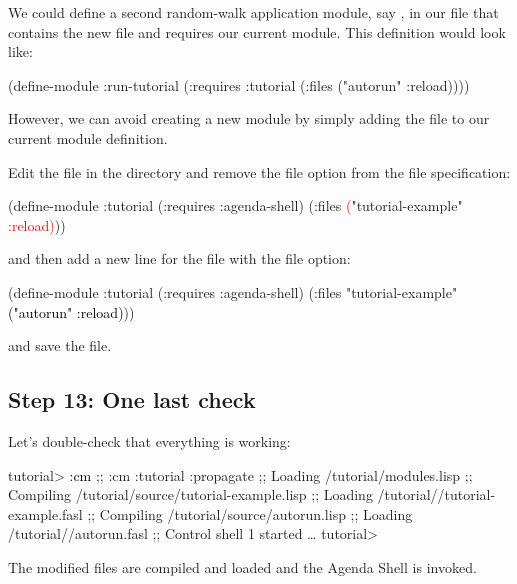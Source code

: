 \documentclass[10pt,twoside,english,pdftex]{article}
\begin{document}
We could define a second random-walk application module, say
, in our  file that
contains the new  file and requires our current
 module.  This definition would look like:
%
\W\supp
\begin{example}
\textcolor{darkergray}{%
  (define-module :run-tutorial
    (:requires :tutorial
    (:files ("autorun" :reload))))}
\end{example}
%
However, we can avoid creating a new module by simply adding the
 file to our current  module definition.  

Edit the  file in the  directory and
remove the  file option from the 
file specification:
%
\W\supp
\begin{example}
\textcolor{darkergray}{%
  (define-module :tutorial
    (:requires :agenda-shell)
    (:files \textcolor{red}{(}"tutorial-example" \textcolor{red}{:reload)}))}
\end{example}
%
and then add a new line for the  file with the 
file option:
%
\W\supp\notpretop
\begin{example}
\textcolor{darkergray}{%
  (define-module :tutorial
    (:requires :agenda-shell)
    (:files "tutorial-example"
            \textcolor{black}{("autorun" :reload)}))}
\end{example}
%
and save the file.

\subsection*{Step 13: One last check}

Let's double-check that everything is working:
%
\W\supp
\begin{smallexample}
\textcolor{darkergray}{%
  tutorial> \textcolor{black}{:cm}
  ;; :cm :tutorial :propagate
  ;; Loading /tutorial/modules.lisp
  ;; Compiling /tutorial/source/tutorial-example.lisp
  ;; Loading /tutorial//tutorial-example.fasl
  ;; Compiling /tutorial/source/autorun.lisp
  ;; Loading /tutorial//autorun.fasl
  ;; Control shell 1 started
     \textrm{\ldots{}}
  tutorial>}
\end{smallexample}
%
The modified files are compiled and loaded and the Agenda Shell is invoked.
\end{document}
